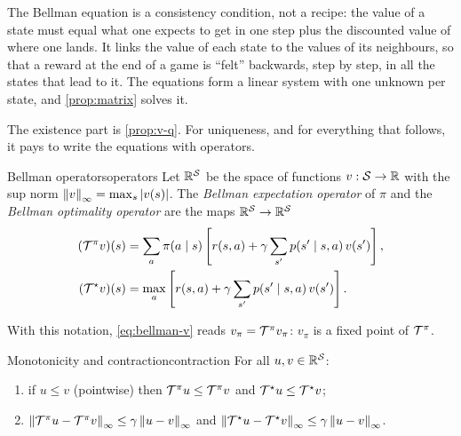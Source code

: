 \begin{intuition}
  The Bellman equation is a consistency condition, not a recipe: the value
  of a state must equal what one expects to get in one step plus the
  discounted value of where one lands. It links the value of each state to
  the values of its neighbours, so that a reward at the end of a game is
  ``felt'' backwards, step by step, in all the states that lead to it.
  The equations form a linear system with one unknown per state, and
  \cref{prop:matrix} solves it.
\end{intuition}

The existence part is \cref{prop:v-q}. For uniqueness, and for everything
that follows, it pays to write the equations with operators.

\begin{definition}{Bellman operators}{operators}
  Let $\mathbb{R}^{\mathcal{S}}$ be the space of functions $v : \mathcal{S} \to \mathbb{R}$ with
  the sup norm $\left\lVert v \right\rVert_\infty = \max_s \left\lvert v(s) \right\rvert$. The \emph{Bellman
  expectation operator} of $\pi$ and the \emph{Bellman optimality operator}
  are the maps $\mathbb{R}^{\mathcal{S}} \to \mathbb{R}^{\mathcal{S}}$
  \begin{align}
    (\mathcal{T}^\pi v)(s) &= \sum_a \pi(a \mid s) \left[ r(s, a) + \gamma \sum_{s'}
      p(s' \mid s, a)\, v(s') \right], \\
    (\mathcal{T}^\star v)(s) &= \max_a \left[ r(s, a) + \gamma \sum_{s'}
      p(s' \mid s, a)\, v(s') \right].
  \end{align}
\end{definition}

With this notation, \eqref{eq:bellman-v} reads $v_\pi = \mathcal{T}^\pi v_\pi$:
$v_\pi$ is a fixed point of $\mathcal{T}^\pi$.

\begin{lemma}{Monotonicity and contraction}{contraction}
  For all $u, v \in \mathbb{R}^{\mathcal{S}}$:
  \begin{enumerate}[nosep, label=(\roman*)]
    \item if $u \leq v$ (pointwise) then $\mathcal{T}^\pi u \leq \mathcal{T}^\pi v$ and
      $\mathcal{T}^\star u \leq \mathcal{T}^\star v$;
    \item $\left\lVert \mathcal{T}^\pi u - \mathcal{T}^\pi v \right\rVert_\infty \leq \gamma \left\lVert u -
      v \right\rVert_\infty$ and $\left\lVert \mathcal{T}^\star u - \mathcal{T}^\star v \right\rVert_\infty \leq \gamma
      \left\lVert u - v \right\rVert_\infty$.
  \end{enumerate}
\end{lemma}

